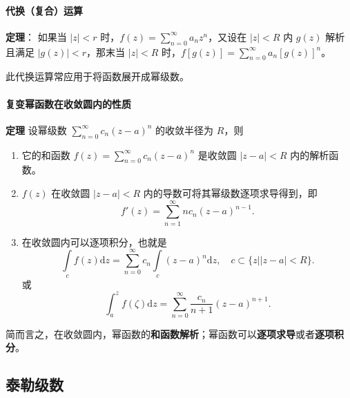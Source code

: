 \paragraph{代换（复合）运算}
\label{代换复合运算}
\textbf{定理}： 如果当 \(|z|<r\)
时，\(f(z)=\sum\limits _{n=0}^{\infty} a_{n}z^{n}\)，又设在 \(|z|<R\) 内
\(g(z)\) 解析且满足 \(|g(z)|<r\)，那末当 \(|z|<R\)
时，\(f[g(z)]=\sum\limits_{n=0}^{\infty} a_{n}[g(z)]^{n}\)。

\begin{tcolorbox}[title={说明},colback=red!5!white
,colframe=red!75!black
,colbacktitle=yellow!50!red
,coltitle=red!25!black, fonttitle=\bfseries,subtitle style={boxrule=0.4pt, colback=yellow!50!red!25!white}]
此代换运算常应用于将函数展开成幂级数。

\end{tcolorbox}
\paragraph{复变幂函数在收敛圆内的性质}
\label{复变幂函数在收敛圆内的性质}
\textbf{定理} 设幂级数 \(\sum\limits_{n=0}^{\infty} c_{n}(z-a)^{n}\)
的收敛半径为 \(R\)，则

\begin{enumerate}
\item 它的和函数 \(f(z) = \sum\limits_{n=0}^{\infty} c_{n}(z-a)^{n}\)
是收敛圆 \(|z-a| < R\) 内的解析函数。
\item \(f(z)\) 在收敛圆 \(|z-a| < R\) 内的导数可将其幂级数逐项求导得到，即
\[
   f'(z) = \sum_{n=1}^{\infty} n c_{n}(z-a)^{n-1}.
   \]
\item 在收敛圆内可以逐项积分，也就是
\[
   \int\limits _c f(z)\mathrm{d}z = \sum _{n=0}^{\infty} c_n\int\limits _c (z-a)^n \mathrm{d}z, \quad c \subset \{ z | \left| z-a \right| < R \}.
   \]
或
\[
   \int _a^z f(\zeta)\mathrm{d}z = \sum _{n=0}^{\infty}\frac{c_n}{n+1}(z-a)^{n+1}.
   \]
\end{enumerate}

\begin{tcolorbox}[title={Note},colback=red!5!white
,colframe=red!75!black
,colbacktitle=yellow!50!red
,coltitle=red!25!black, fonttitle=\bfseries,subtitle style={boxrule=0.4pt, colback=yellow!50!red!25!white}]
简而言之，在收敛圆内，幂函数的\textbf{和函数解析}；幂函数可以\textbf{逐项求导}或者\textbf{逐项积分}。

\end{tcolorbox}
\subsection{泰勒级数}
\label{泰勒级数}
